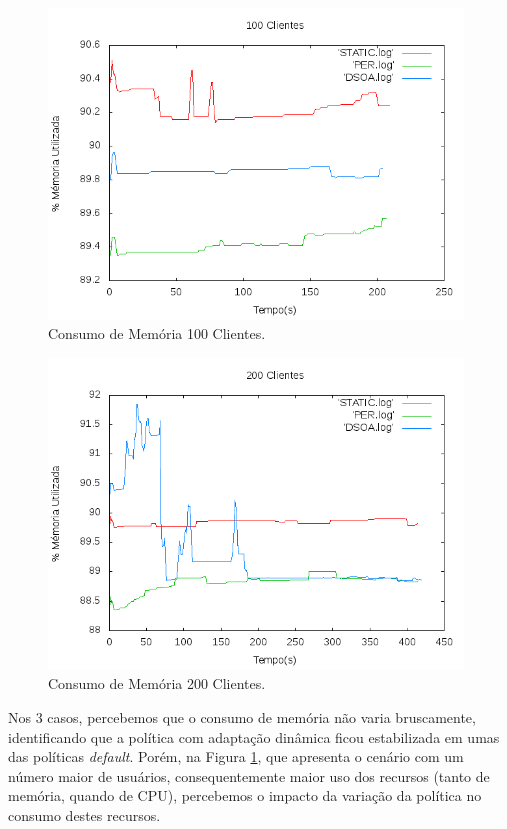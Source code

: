 \begin{figure}[htp]
\centering
\includegraphics[width=11cm]{chapters/chapter4/mem-100.png}
\caption[Consumo de Memória 100 Clientes]{Consumo de Memória 100 Clientes.}
\end{figure}

\begin{figure}[htp]
\centering
\includegraphics[width=11cm]{chapters/chapter4/mem-200.png}
\caption[Consumo de Memória 200 Clientes]{Consumo de Memória 200 Clientes.}
\label{fig:200-cl}
\end{figure}

Nos 3 casos, percebemos que o consumo de memória não varia bruscamente, identificando que a política com adaptação dinâmica ficou estabilizada em umas das políticas \textit{default}. Porém, na Figura \ref{fig:200-cl}, que apresenta o cenário com um número maior de usuários, consequentemente maior uso dos recursos (tanto de memória, quando de CPU), percebemos o impacto da variação da política no consumo destes recursos.

